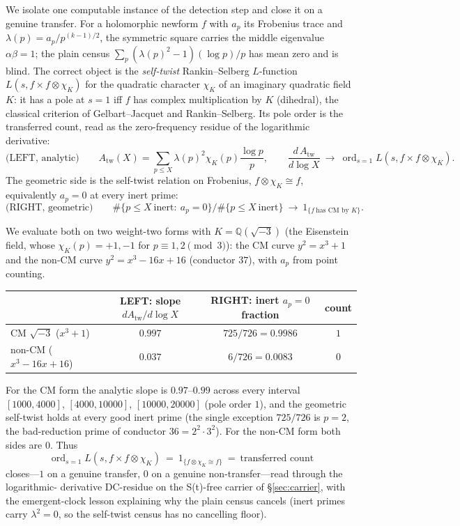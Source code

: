 \documentclass[11pt]{article}
\theoremstyle{definition}
\newcommand{\ord}{\operatorname{ord}}
\begin{document}
We isolate one computable instance of the detection step and close it on a genuine transfer. For a
holomorphic newform $f$ with $a_p$ its Frobenius trace and $\lambda(p)=a_p/p^{(k-1)/2}$, the
symmetric square carries the middle eigenvalue $\alpha\beta=1$; the plain census
$\sum_p(\lambda(p)^2-1)(\log p)/p$ has mean zero and is blind. The correct object is the
\emph{self-twist} Rankin--Selberg $L$-function $L(s,f\times f\otimes\chi_K)$ for the quadratic
character $\chi_K$ of an imaginary quadratic field $K$: it has a pole at $s=1$ iff $f$ has complex
multiplication by $K$ (dihedral), the classical criterion of Gelbart--Jacquet \cite{GJ} and
Rankin--Selberg.
Its pole order is the transferred count, read as the zero-frequency residue of the logarithmic
derivative:
\[
  \text{(LEFT, analytic)}\qquad
  A_{\mathrm{tw}}(X)=\sum_{p\le X}\lambda(p)^2\chi_K(p)\frac{\log p}{p},\qquad
  \frac{d\,A_{\mathrm{tw}}}{d\log X}\ \longrightarrow\ \ord_{s=1}L(s,f\times f\otimes\chi_K).
\]
The geometric side is the self-twist relation on Frobenius, $f\otimes\chi_K\cong f$, equivalently
$a_p=0$ at every inert prime:
\[
  \text{(RIGHT, geometric)}\qquad
  \#\{p\le X\ \text{inert}:\ a_p=0\}\big/\#\{p\le X\ \text{inert}\}\ \longrightarrow\ 1_{\{f\ \text{has CM by }K\}}.
\]

We evaluate both on two weight-two forms with $K=\mathbb Q(\sqrt{-3})$ (the Eisenstein field, whose
$\chi_K(p)=+1,-1$ for $p\equiv1,2\pmod3$): the CM curve $y^2=x^3+1$ and the non-CM curve
$y^2=x^3-16x+16$ (conductor $37$), with $a_p$ from point counting.

\begin{center}
\begin{tabular}{lccc}
\toprule
 & LEFT: slope $dA_{\mathrm{tw}}/d\log X$ & RIGHT: inert $a_p=0$ fraction & count \\
\midrule
CM $\sqrt{-3}$ ($x^3+1$) & $0.997$ & $725/726=0.9986$ & $1$ \\
non-CM ($x^3-16x+16$) & $0.037$ & $6/726=0.0083$ & $0$ \\
\bottomrule
\end{tabular}
\end{center}

For the CM form the analytic slope is $0.97$--$0.99$ across every interval $[1000,4000]$,
$[4000,10000]$, $[10000,20000]$ (pole order $1$), and the geometric self-twist holds at every good
inert prime (the single exception $725/726$ is $p=2$, the bad-reduction prime of conductor
$36=2^2\cdot3^2$). For the non-CM form both sides are $0$. Thus
\[
  \boxed{\ \ord_{s=1}L(s,f\times f\otimes\chi_K)\ =\ 1_{\{f\otimes\chi_K\cong f\}}\ =\ \text{transferred count}\ }
\]
closes---$1$ on a genuine transfer, $0$ on a genuine non-transfer---read through the logarithmic-
derivative DC-residue on the S(t)-free carrier of \S\ref{sec:carrier}, with the emergent-clock
lesson explaining why the plain census cancels (inert primes carry $\lambda^2=0$, so the self-twist
census has no cancelling floor).
\end{document}
